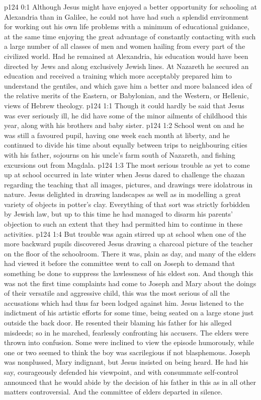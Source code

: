\author{Midwayer Commission}
\vs p124 0:1 Although Jesus might have enjoyed a better opportunity for schooling at Alexandria than in Galilee, he could not have had such a splendid environment for working out his own life problems with a minimum of educational guidance, at the same time enjoying the great advantage of constantly contacting with such a large number of all classes of men and women hailing from every part of the civilized world. Had he remained at Alexandria, his education would have been directed by Jews and along exclusively Jewish lines. At Nazareth he secured an education and received a training which more acceptably prepared him to understand the gentiles, and which gave him a better and more balanced idea of the relative merits of the Eastern, or Babylonian, and the Western, or Hellenic, views of Hebrew theology.
\vs p124 1:1 Though it could hardly be said that Jesus was ever seriously ill, he did have some of the minor ailments of childhood this year, along with his brothers and baby sister.
\vs p124 1:2 School went on and he was still a favoured pupil, having one week each month at liberty, and he continued to divide his time about equally between trips to neighbouring cities with his father, sojourns on his uncle’s farm south of Nazareth, and fishing excursions out from Magdala.
\vs p124 1:3 \pc The most serious trouble as yet to come up at school occurred in late winter when Jesus dared to challenge the chazan regarding the teaching that all images, pictures, and drawings were idolatrous in nature. Jesus delighted in drawing landscapes as well as in modelling a great variety of objects in potter’s clay. Everything of that sort was strictly forbidden by Jewish law, but up to this time he had managed to disarm his parents’ objection to such an extent that they had permitted him to continue in these activities.
\vs p124 1:4 But trouble was again stirred up at school when one of the more backward pupils discovered Jesus drawing a charcoal picture of the teacher on the floor of the schoolroom. There it was, plain as day, and many of the elders had viewed it before the committee went to call on Joseph to demand that something be done to suppress the lawlessness of his eldest son. And though this was not the first time complaints had come to Joseph and Mary about the doings of their versatile and aggressive child, this was the most serious of all the accusations which had thus far been lodged against him. Jesus listened to the indictment of his artistic efforts for some time, being seated on a large stone just outside the back door. He resented their blaming his father for his alleged misdeeds; so in he marched, fearlessly confronting his accusers. The elders were thrown into confusion. Some were inclined to view the episode humorously, while one or two seemed to think the boy was sacrilegious if not blasphemous. Joseph was nonplussed, Mary indignant, but Jesus insisted on being heard. He had his say, courageously defended his viewpoint, and with consummate self\hyp{}control announced that he would abide by the decision of his father in this as in all other matters controversial. And the committee of elders departed in silence.

